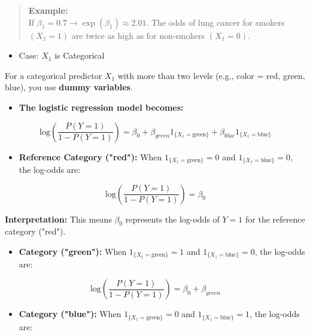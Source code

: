 \documentclass{article}
\providecommand{\tightlist}{%
  \setlength{\itemsep}{0pt}\setlength{\parskip}{0pt}}
\begin{document}
\begin{quote}
\textbf{Example:}\\
If \(\beta_1 = 0.7 \rightarrow \exp(\beta_1) \approx 2.01\). The odds of
lung cancer for smokers \((X_1=1)\) are twice as high as for non-smokers
\((X_1=0)\).
\end{quote}

\begin{itemize}
\tightlist
\item
  Case: \(X_1\) is Categorical
\end{itemize}

For a categorical predictor \(X_1\) with more than two levels (e.g.,
color = red, green, blue), you use \textbf{dummy variables}.

\begin{itemize}
\tightlist
\item
  \textbf{The logistic regression model becomes:}
\end{itemize}

\[\text{log}\left( \dfrac{P(Y=1)}{1 - P(Y=1)} \right) = \beta_0 + \beta_{green}1_{\{X_1 = \text{green}\}} + \beta_{blue}1_{\{X_1 = \text{blue}\}}\]

\begin{itemize}
\tightlist
\item
  \textbf{Reference Category ("red"):} When
  \(1_{\{X_1 = \text{green}\}}=0\) and \(1_{\{X_1 = \text{blue}\}}=0\),
  the log-odds are:
\end{itemize}

\[\text{log}\left( \dfrac{P(Y=1)}{1 - P(Y=1)} \right) = \beta_0\]

\textbf{Interpretation:} This means \(\beta_0\)\hspace{0pt} represents
the log-odds of \(Y=1\) for the reference category ("red").

\begin{itemize}
\tightlist
\item
  \textbf{Category ("green"):} When \(1_{\{X_1 = \text{green}\}}=1\) and
  \(1_{\{X_1 = \text{blue}\}}=0\), the log-odds are:
\end{itemize}

\[\text{log}\left( \dfrac{P(Y=1)}{1 - P(Y=1)} \right) = \beta_0 + \beta_{green}\]

\begin{itemize}
\tightlist
\item
  \textbf{Category ("blue"):} When \(1_{\{X_1 = \text{green}\}}=0\) and
  \(1_{\{X_1 = \text{blue}\}}=1\), the log-odds are:
\end{itemize}
\end{document}

